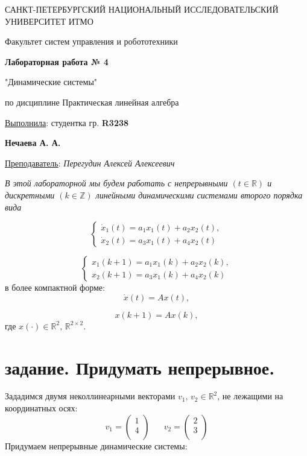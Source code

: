 \documentclass[a5paper, 10pt]{article}
\theoremstyle{definition}
\theoremstyle{plain}
\theoremstyle{remark}
\newcommand*{\titlePage}{
	\thispagestyle{title}
	\begingroup
	\begin{center}
		\vspace*{6ex}
		
		{\small
			САНКТ-ПЕТЕРБУРГСКИЙ НАЦИОНАЛЬНЫЙ ИССЛЕДОВАТЕЛЬСКИЙ УНИВЕРСИТЕТ ИТМО	
		}
		
		\vspace*{2ex}
		
		{\normalsize
			Факультет систем управления и робототехники
		}
		
		\vspace*{15ex}
		
		{\Large \bfseries 
			Лабораторная работа № 4
		}
\vspace*{2ex}
	{\Large \bfseries 
			
"Динамические системы"
		}
\vspace*{2ex}
		
		{\normalsize
			по дисциплине Практическая линейная алгебра
		}

	\end{center}
	\vspace*{20ex}
	\begin{flushright}
		{\large 
			\underline{Выполнила}: студентка гр. \textbf{R3238}\\
			\begin{flushright}
				\textbf{Нечаева А. А.}\\
			\end{flushright}
		}
		
		\vspace*{5ex}
		
		{\large 
			\underline{Преподаватель}: \textit{Перегудин Алексей Алексеевич}
		}
	\end{flushright}	
	\newpage
	\setcounter{page}{1}
	\endgroup}
\begin{document}
	\titlePage
	\pagestyle{style}
\newpage
\textit{В этой лабораторной мы будем работать с непрерывными $ \left( t \in \mathbb{R} \right) $ и дискретными $ \left( k \in \mathbb{Z} \right)$  линейными динамическими системами второго порядка вида}

\begin{equation}
\begin{cases}
\dot{x}_1(t) = a_1x_1(t)+a_2x_2(t),\\
\dot{x}_2(t) = a_3x_1(t)+a_4x_2(t)
\end{cases}
\end{equation}

\begin{equation}
\begin{cases}
x_1(k+1) = a_1x_1(k)+a_2x_2(k),\\
x_2(k+1) = a_3x_1(k)+a_4x_2(k)
\end{cases}
\end{equation}
в более компактной форме:
\begin{equation}
\dot{x}(t) = Ax(t),
\end{equation}

\begin{equation}
x(k+1) = Ax(k),
\end{equation}
где $x(\cdot) \in  \mathbb{R}^2, \,  \mathbb{R}^{2 \times 2} $.

\newpage
\section{задание. Придумать непрерывное.}
Зададимся двумя неколлинеарными векторами $v_1, \, v_2 \in \mathbb{R}^2$, не лежащими на координатных осях:
\begin{equation}
v_1 =
\begin{pmatrix}
1\\
4\\
\end{pmatrix}
\, \, \, \, \, \, \, \, \, \,
v_2 =
\begin{pmatrix}
2\\
3\\
\end{pmatrix}
\end{equation}
Придумаем непрерывные динамические системы:

\end{document}

